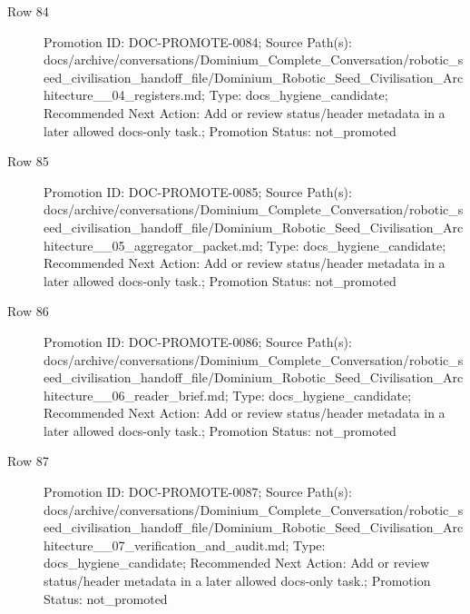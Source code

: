 \documentclass[9pt,a4paper,openany]{book}
\begin{document}
\begin{description}
\item[Row 84] Promotion ID: DOC-\allowbreak{}PROMOTE-\allowbreak{}0084; Source Path(s): docs/\allowbreak{}archive/\allowbreak{}conversations/\allowbreak{}Dominium\_\allowbreak{}Complete\_\allowbreak{}Conversation/\allowbreak{}robotic\_\allowbreak{}seed\_\allowbreak{}civilisation\_\allowbreak{}handoff\_\allowbreak{}file/\allowbreak{}Dominium\_\allowbreak{}Robotic\_\allowbreak{}Seed\_\allowbreak{}Civilisation\_\allowbreak{}Architecture\_\allowbreak{}\_\allowbreak{}04\_\allowbreak{}registers.\allowbreak{}md; Type: docs\_\allowbreak{}hygiene\_\allowbreak{}candidate; Recommended Next Action: Add or review status/\allowbreak{}header metadata in a later allowed docs-\allowbreak{}only task.\allowbreak{}; Promotion Status: not\_\allowbreak{}promoted
\item[Row 85] Promotion ID: DOC-\allowbreak{}PROMOTE-\allowbreak{}0085; Source Path(s): docs/\allowbreak{}archive/\allowbreak{}conversations/\allowbreak{}Dominium\_\allowbreak{}Complete\_\allowbreak{}Conversation/\allowbreak{}robotic\_\allowbreak{}seed\_\allowbreak{}civilisation\_\allowbreak{}handoff\_\allowbreak{}file/\allowbreak{}Dominium\_\allowbreak{}Robotic\_\allowbreak{}Seed\_\allowbreak{}Civilisation\_\allowbreak{}Architecture\_\allowbreak{}\_\allowbreak{}05\_\allowbreak{}aggregator\_\allowbreak{}packet.\allowbreak{}md; Type: docs\_\allowbreak{}hygiene\_\allowbreak{}candidate; Recommended Next Action: Add or review status/\allowbreak{}header metadata in a later allowed docs-\allowbreak{}only task.\allowbreak{}; Promotion Status: not\_\allowbreak{}promoted
\item[Row 86] Promotion ID: DOC-\allowbreak{}PROMOTE-\allowbreak{}0086; Source Path(s): docs/\allowbreak{}archive/\allowbreak{}conversations/\allowbreak{}Dominium\_\allowbreak{}Complete\_\allowbreak{}Conversation/\allowbreak{}robotic\_\allowbreak{}seed\_\allowbreak{}civilisation\_\allowbreak{}handoff\_\allowbreak{}file/\allowbreak{}Dominium\_\allowbreak{}Robotic\_\allowbreak{}Seed\_\allowbreak{}Civilisation\_\allowbreak{}Architecture\_\allowbreak{}\_\allowbreak{}06\_\allowbreak{}reader\_\allowbreak{}brief.\allowbreak{}md; Type: docs\_\allowbreak{}hygiene\_\allowbreak{}candidate; Recommended Next Action: Add or review status/\allowbreak{}header metadata in a later allowed docs-\allowbreak{}only task.\allowbreak{}; Promotion Status: not\_\allowbreak{}promoted
\item[Row 87] Promotion ID: DOC-\allowbreak{}PROMOTE-\allowbreak{}0087; Source Path(s): docs/\allowbreak{}archive/\allowbreak{}conversations/\allowbreak{}Dominium\_\allowbreak{}Complete\_\allowbreak{}Conversation/\allowbreak{}robotic\_\allowbreak{}seed\_\allowbreak{}civilisation\_\allowbreak{}handoff\_\allowbreak{}file/\allowbreak{}Dominium\_\allowbreak{}Robotic\_\allowbreak{}Seed\_\allowbreak{}Civilisation\_\allowbreak{}Architecture\_\allowbreak{}\_\allowbreak{}07\_\allowbreak{}verification\_\allowbreak{}and\_\allowbreak{}audit.\allowbreak{}md; Type: docs\_\allowbreak{}hygiene\_\allowbreak{}candidate; Recommended Next Action: Add or review status/\allowbreak{}header metadata in a later allowed docs-\allowbreak{}only task.\allowbreak{}; Promotion Status: not\_\allowbreak{}promoted

\end{description}
\end{document}
